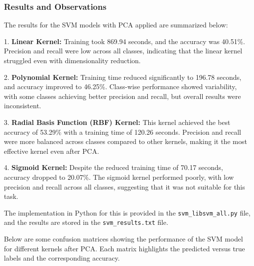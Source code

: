 \documentclass[lettersize,journal]{IEEEtran}
\begin{document}
\vspace{0.5cm}

\subsubsection{\textbf{Results and Observations}}
The results for the SVM models with PCA applied are summarized below:

1. \textbf{Linear Kernel:}  
   Training took 869.94 seconds, and the accuracy was 40.51\%. Precision and recall were low across all classes, indicating that the linear kernel struggled even with dimensionality reduction.

2. \textbf{Polynomial Kernel:}  
   Training time reduced significantly to 196.78 seconds, and accuracy improved to 46.25\%. Class-wise performance showed variability, with some classes achieving better precision and recall, but overall results were inconsistent.

3. \textbf{Radial Basis Function (RBF) Kernel:}  
   This kernel achieved the best accuracy of 53.29\% with a training time of 120.26 seconds. Precision and recall were more balanced across classes compared to other kernels, making it the most effective kernel even after PCA.

4. \textbf{Sigmoid Kernel:}  
   Despite the reduced training time of 70.17 seconds, accuracy dropped to 20.07\%. The sigmoid kernel performed poorly, with low precision and recall across all classes, suggesting that it was not suitable for this task.

\vspace{0.3cm}
The implementation in Python for this is provided in the \texttt{svm\_libsvm\_all.py} file, and the results are stored in the \texttt{svm\_results.txt} file.

Below are some confusion matrices showing the performance of the SVM model for different kernels after PCA. Each matrix highlights the predicted versus true labels and the corresponding accuracy.
\end{document}
